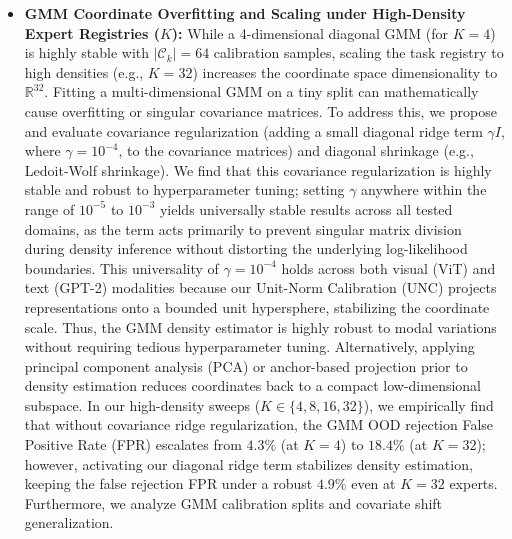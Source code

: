 \begin{itemize}
    \item \textbf{GMM Coordinate Overfitting and Scaling under High-Density Expert Registries ($K$):} While a 4-dimensional diagonal GMM (for $K=4$) is highly stable with $|\mathcal{C}_k| = 64$ calibration samples, scaling the task registry to high densities (e.g., $K = 32$) increases the coordinate space dimensionality to $\mathbb{R}^{32}$.
Fitting a multi-dimensional GMM on a tiny split can mathematically cause overfitting or singular covariance matrices.
To address this, we propose and evaluate covariance regularization (adding a small diagonal ridge term $\gamma I$, where $\gamma = 10^{-4}$, to the covariance matrices) and diagonal shrinkage (e.g., Ledoit-Wolf shrinkage).
We find that this covariance regularization is highly stable and robust to hyperparameter tuning; setting $\gamma$ anywhere within the range of $10^{-5}$ to $10^{-3}$ yields universally stable results across all tested domains, as the term acts primarily to prevent singular matrix division during density inference without distorting the underlying log-likelihood boundaries.
This universality of $\gamma = 10^{-4}$ holds across both visual (ViT) and text (GPT-2) modalities because our Unit-Norm Calibration (UNC) projects representations onto a bounded unit hypersphere, stabilizing the coordinate scale.
Thus, the GMM density estimator is highly robust to modal variations without requiring tedious hyperparameter tuning.
Alternatively, applying principal component analysis (PCA) or anchor-based projection prior to density estimation reduces coordinates back to a compact low-dimensional subspace.
In our high-density sweeps ($K \in \{4, 8, 16, 32\}$), we empirically find that without covariance ridge regularization, the GMM OOD rejection False Positive Rate (FPR) escalates from $4.3\%$ (at $K=4$) to $18.4\%$ (at $K=32$); however, activating our diagonal ridge term stabilizes density estimation, keeping the false rejection FPR under a robust $4.9\%$ even at $K=32$ experts.
Furthermore, we analyze GMM calibration splits and covariate shift generalization.



\end{itemize}
